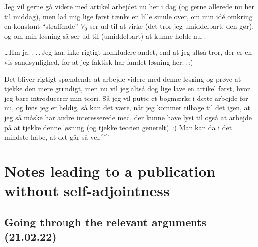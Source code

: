 \documentclass{report}
\begin{document}
Jeg vil gerne gå videre med artikel arbejdet nu her i dag (og gerne allerede nu her til middag), %
men lad mig lige først tænke en lille smule over, om min idé omkring en konstant ``straffende'' $V_0$ ser ud til at virke (det tror jeg umiddelbart, den gør), og om min løsning så ser ud til (umiddelbart) at kunne holde nu.\,. 

\ldots Hm ja.\,. .\,.\,Jeg kan ikke rigtigt konkludere andet, end at jeg altså tror, der er en vis sandsynlighed, for at jeg faktisk har fundet løsning her.\,.\,:) 

Det bliver rigtigt spændende at arbejde videre med denne løsning og prøve at tjekke den mere grundigt, men nu vil jeg altså dog lige lave en artikel først, hvor jeg bare introducerer min teori. Så jeg vil putte et bogmærke i dette arbejde for nu, og hvis jeg er heldig, så kan det være, når jeg kommer tilbage til det igen, at jeg så måske har andre interesserede med, der kunne have lyst til også at arbejde på at tjekke denne løsning (og tjekke teorien generelt).\,:) Man kan da i det mindste håbe, at det går så vel.\textasciicircum\textasciicircum\ 







\chapter{Notes leading to a publication without self-adjointness}

\section{Going through the relevant arguments (21.02.22)}
\end{document}
